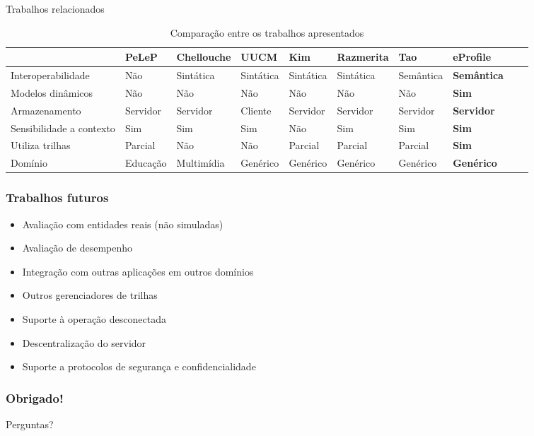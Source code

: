\documentclass[14pt]{beamer}
\begin{document}
\begin{frame}{Trabalhos relacionados}

	\begin{table}\centering\tiny
  \begin{tabular*}{1\textwidth}{@{}llllllllll@{}}
    \toprule
                              & PeLeP    & Chellouche & UUCM      & Kim       & Razmerita & Tao       & {\bf eProfile}  \\
    \midrule
    Interoperabilidade        & Não      & Sintática  & Sintática & Sintática & Sintática & Semântica & {\bf Semântica} \\
    Modelos dinâmicos         & Não      & Não        & Não       & Não       & Não       & Não       & {\bf Sim}       \\
    Armazenamento             & Servidor & Servidor   & Cliente   & Servidor  & Servidor  & Servidor  & {\bf Servidor} \\
    Sensibilidade a contexto  & Sim      & Sim        & Sim       & Não       & Sim  & Sim  & {\bf Sim} \\
    Utiliza trilhas           & Parcial  & Não        & Não       & Parcial   & Parcial   & Parcial   & {\bf Sim}      \\
    Domínio                   & Educação & Multimídia & Genérico  & Genérico  & Genérico  & Genérico  & {\bf Genérico} \\
    \bottomrule
  \end{tabular*}
  \caption{Comparação entre os trabalhos apresentados}
  \label{tab:comparacao}
\end{table}

\end{frame}


\begin{frame}
  \frametitle{Trabalhos futuros}
  \begin{itemize}
    \item Avaliação com entidades reais (não simuladas)
    \item Avaliação de desempenho
    \item Integração com outras aplicações em outros domínios
    \item Outros gerenciadores de trilhas
    \item Suporte à operação desconectada
    \item Descentralização do servidor
    \item Suporte a protocolos de segurança e confidencialidade
  \end{itemize}
\end{frame}


\begin{frame}
  \frametitle{Obrigado!}
  Perguntas?
\end{frame}
\end{document}
